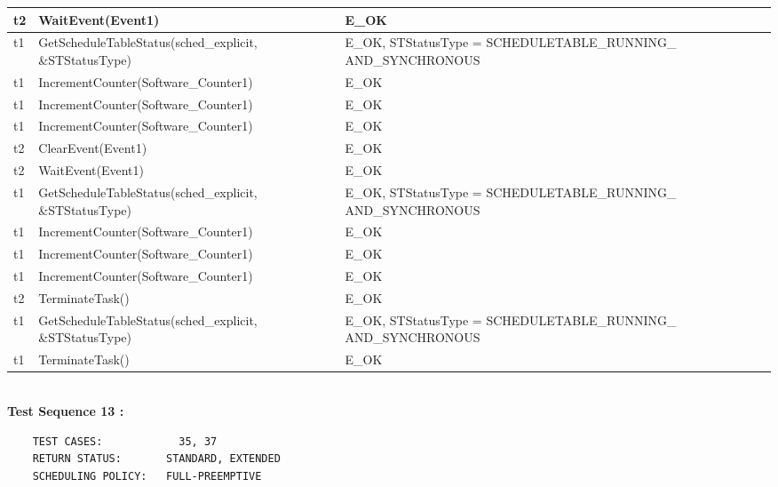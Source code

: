 \documentclass[10pt]{article}
\newlength{\Li}\settowidth{\Li}{Running}
\newlength{\Lii}\setlength{\Lii}{7cm}
\newlength{\Liiii}\setlength{\Liiii}{0.9cm}
\newlength{\Liii}\setlength{\Liii}{\textwidth} \addtolength{\Liii}{-\Li} \addtolength{\Liii}{-\Lii} \addtolength{\Liii}{-\Liiii}
\begin{document}
\begin{supertabular}{|p{\Li}|p{\Lii}|p{\Liii}|p{\Liiii}|}
	t2		& WaitEvent(Event1)											& E\_OK																	& \\ \hline
	t1		& GetScheduleTableStatus(sched\_explicit, \&STStatusType)			& E\_OK, STStatusType = SCHEDULETABLE\_RUNNING\_ AND\_SYNCHRONOUS		& \\ \hline
	t1		& IncrementCounter(Software\_Counter1)						& E\_OK																	& \\ \hline
	t1		& IncrementCounter(Software\_Counter1)						& E\_OK																	& \\ \hline
	t1		& IncrementCounter(Software\_Counter1)						& E\_OK																	& \\ \hline
	t2		& ClearEvent(Event1)										& E\_OK																	& \\ \hline
	t2		& WaitEvent(Event1)											& E\_OK																	& \\ \hline
	t1		& GetScheduleTableStatus(sched\_explicit, \&STStatusType)			& E\_OK, STStatusType = SCHEDULETABLE\_RUNNING\_ AND\_SYNCHRONOUS		& \\ \hline
	t1		& IncrementCounter(Software\_Counter1)						& E\_OK																	& \\ \hline
	t1		& IncrementCounter(Software\_Counter1)						& E\_OK																	& \\ \hline
	t1		& IncrementCounter(Software\_Counter1)						& E\_OK																	& \\ \hline
	t2		& TerminateTask()											& E\_OK																	& \\ \hline
	t1		& GetScheduleTableStatus(sched\_explicit, \&STStatusType)			& E\_OK, STStatusType = SCHEDULETABLE\_RUNNING\_ AND\_SYNCHRONOUS		& \\ \hline
	t1		& TerminateTask()											& E\_OK																	& \\ \hline
	\end{supertabular}\\

	\textbf{Test Sequence 13 :}
	\begin{lstlisting}
	TEST CASES:		       35, 37
	RETURN STATUS:	  	 STANDARD, EXTENDED
	SCHEDULING POLICY:   FULL-PREEMPTIVE
	\end{lstlisting}
	
	
\end{document}
